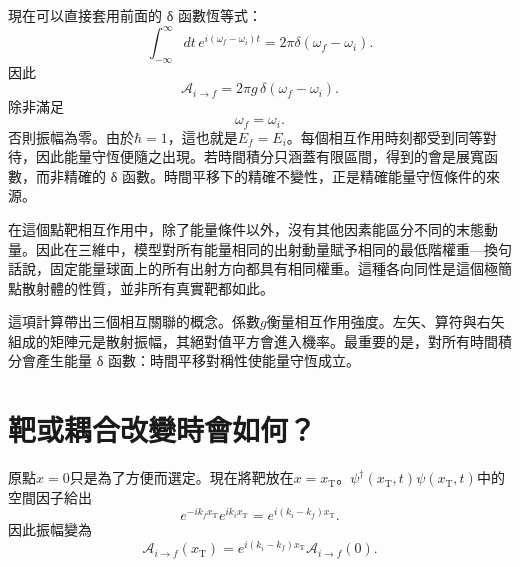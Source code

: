 現在可以直接套用前面的 {\proseunicodefont δ} 函數恆等式：
\begin{equation}
\int_{-\infty}^{\infty}dt\,
e^{i(\omega_f-\omega_i)t}
=2\pi\delta(\omega_f-\omega_i).
\end{equation}
因此
\begin{equation}
\boxed{
\mathcal A_{i\to f}
=2\pi g\,\delta(\omega_f-\omega_i)
}.
\end{equation}
除非滿足
\begin{equation}
\omega_f=\omega_i.
\end{equation}
否則振幅為零。由於\(\hbar=1\)，這也就是\(E_f=E_i\)。每個相互作用時刻都受到同等對待，因此能量守恆便隨之出現。若時間積分只涵蓋有限區間，得到的會是展寬函數，而非精確的 {\proseunicodefont δ} 函數。時間平移下的精確不變性，正是精確能量守恆條件的來源。

\begin{classroomqa}
\end{classroomqa}


在這個點靶相互作用中，除了能量條件以外，沒有其他因素能區分不同的末態動量。因此在三維中，模型對所有能量相同的出射動量賦予相同的最低階權重---換句話說，固定能量球面上的所有出射方向都具有相同權重。這種各向同性是這個極簡點散射體的性質，並非所有真實靶都如此。

這項計算帶出三個相互關聯的概念。係數\(g\)衡量相互作用強度。左矢、算符與右矢組成的矩陣元是散射振幅，其絕對值平方會進入機率。最重要的是，對所有時間積分會產生能量 {\proseunicodefont δ} 函數：時間平移對稱性使能量守恆成立。

\section{靶或耦合改變時會如何？}

原點\(x=0\)只是為了方便而選定。現在將靶放在\(x=x_{\mathrm T}\)。\(\psi^\dagger(x_{\mathrm T},t)\psi(x_{\mathrm T},t)\)中的空間因子給出
\begin{equation}
e^{-ik_f x_{\mathrm T}}e^{ik_i x_{\mathrm T}}
=e^{i(k_i-k_f)x_{\mathrm T}}.
\end{equation}
因此振幅變為
\begin{equation}
\mathcal A_{i\to f}(x_{\mathrm T})
=e^{i(k_i-k_f)x_{\mathrm T}}
\mathcal A_{i\to f}(0).
\end{equation}

